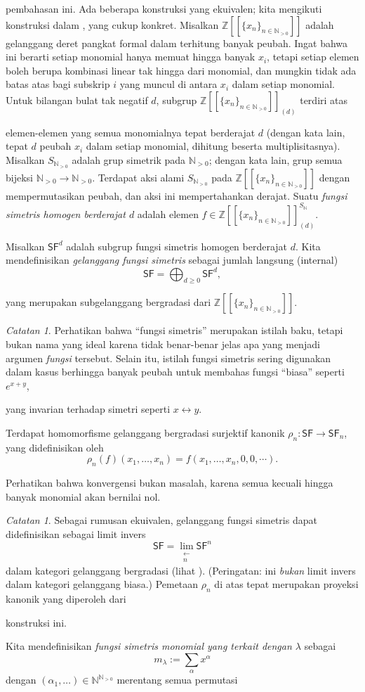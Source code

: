 \documentclass[12pt]{article}
\theoremstyle{plain}
\theoremstyle{definition}
\theoremstyle{remark}
\newtheorem{remark}[theorem]{Catatan}
\numberwithin{equation}{section}
\begin{document}
pembahasan ini. Ada beberapa konstruksi yang ekuivalen; kita mengikuti
konstruksi dalam \cite{Stanley2}, yang cukup konkret.
Misalkan $\mathbb{Z}[[\{x_n\}_{n \in \mathbb{N}_{>0}}]]$ adalah gelanggang deret
pangkat formal dalam terhitung banyak peubah. Ingat bahwa ini berarti
setiap monomial hanya memuat hingga banyak $x_i$, tetapi setiap elemen boleh berupa
kombinasi linear tak hingga dari monomial, dan mungkin tidak ada batas atas
bagi subskrip $i$ yang muncul di antara $x_i$ dalam setiap
monomial.
Untuk bilangan bulat tak negatif $d$, subgrup
$\mathbb{Z}[[\{x_n\}_{n \in \mathbb{N}_{>0}}]]_{(d)}$ terdiri atas

elemen-elemen yang semua monomialnya tepat berderajat $d$ (dengan kata lain,
tepat $d$ peubah $x_i$ dalam setiap monomial, dihitung beserta multiplisitasnya).
Misalkan $S_{\mathbb{N}_{>0}}$ adalah grup simetrik pada $\mathbb{N}_{>0}$; dengan
kata lain, grup semua bijeksi $\mathbb{N}_{>0} \to \mathbb{N}_{>0}$.
Terdapat aksi alami $S_{\mathbb{N}_{>0}}$ pada
$\mathbb{Z}[[\{x_n\}_{n \in \mathbb{N}_{>0}}]]$ dengan mempermutasikan peubah, dan aksi ini
mempertahankan derajat.
Suatu \emph{fungsi simetris homogen berderajat $d$} adalah elemen
$f \in \mathbb{Z}[[\{x_n\}_{n \in \mathbb{N}_{>0}}]]_{(d)}^{S_{\mathbb{N}}}$.

Misalkan $\mathsf{SF}^d$ adalah subgrup
fungsi simetris homogen berderajat $d$.
Kita mendefinisikan \emph{gelanggang fungsi simetris} sebagai jumlah langsung (internal)
\[
\mathsf{SF} = \bigoplus_{d \ge 0} \mathsf{SF}^d,
\]

yang merupakan subgelanggang bergradasi dari $\mathbb{Z}[[\{x_n\}_{n \in \mathbb{N}_{>0}}]]$.
\begin{remark}
Perhatikan bahwa ``fungsi simetris'' merupakan istilah baku,
tetapi bukan nama yang ideal karena tidak benar-benar jelas
apa yang menjadi argumen \emph{fungsi} tersebut.
Selain itu, istilah fungsi simetris sering digunakan dalam kasus
berhingga banyak peubah untuk membahas fungsi ``biasa'' seperti $e^{x+y}$,

yang invarian terhadap simetri seperti $x \leftrightarrow y$.
\end{remark}
Terdapat homomorfisme gelanggang bergradasi surjektif kanonik
$\rho_n : \mathsf{SF} \to \mathsf{SF}_n$, yang didefinisikan oleh
\[
\rho_n(f)(x_1,\ldots,x_n) = f(x_1,\ldots,x_n,0,0,\cdots) .
\]

Perhatikan bahwa konvergensi bukan masalah, karena semua kecuali hingga banyak monomial
akan bernilai nol.
\begin{remark}
Sebagai rumusan ekuivalen, gelanggang fungsi simetris dapat didefinisikan sebagai limit
invers
\[
\mathsf{SF} = \lim_{\substack{\longleftarrow\\n}} \mathsf{SF}^n
\]
dalam kategori gelanggang bergradasi (lihat \cite{Macdonald}).
(Peringatan: ini \emph{bukan} limit invers dalam kategori gelanggang biasa.)
Pemetaan $\rho_n$ di atas tepat merupakan proyeksi kanonik yang diperoleh dari

konstruksi ini.
\end{remark}
Kita mendefinisikan \emph{fungsi simetris monomial yang terkait dengan $\lambda$}
sebagai
\[
m_\lambda := \sum_{\alpha} x^\alpha
\]
dengan $(\alpha_1,\ldots) \in \mathbb{N}^{\mathbb{N}_{>0}}$ merentang semua permutasi
\end{document}
